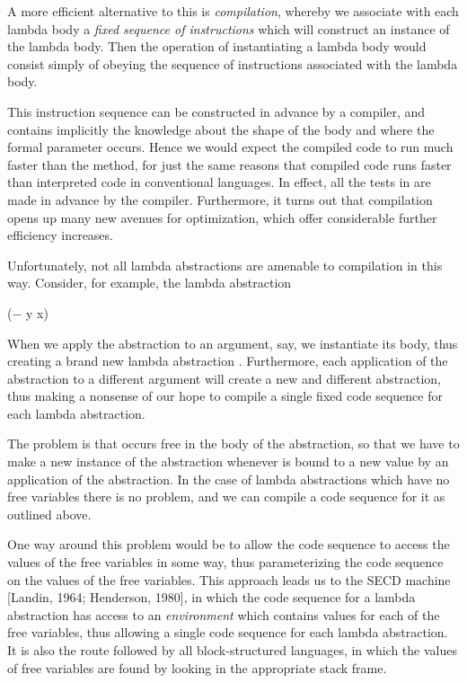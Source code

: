 A more efficient alternative to this is \textit{compilation}, whereby we associate
with each lambda body a \textit{fixed sequence of instructions} which will construct an
instance of the lambda body. Then the operation of instantiating a lambda
body would consist simply of obeying the sequence of instructions associated
with the lambda body.

This instruction sequence can be constructed in advance by a compiler, and
contains implicitly the knowledge about the shape of the body and where the
formal parameter occurs. Hence we would expect the compiled code to run
much faster than the  method, for just the same reasons that
compiled code runs faster than interpreted code in conventional languages. In
effect, all the tests in  are made in advance by the compiler.
Furthermore, it turns out that compilation opens up many new avenues for
optimization, which offer considerable further efficiency increases.

Unfortunately, not all lambda abstractions are amenable to compilation in
this way. Consider, for example, the lambda abstraction

\begin{letalign}
    ($-$ y x)
\end{letalign}

When we apply the  abstraction to an argument,  say, we instantiate its
body, thus creating a brand new lambda abstraction .
Furthermore, each application of the  abstraction to a different argument
will create a new and different  abstraction, thus making a nonsense of our
hope to compile a single fixed code sequence for each lambda abstraction.

The problem is that  occurs free in the body of the  abstraction, so that
we have to make a new instance of the  abstraction whenever  is bound to a
new value by an application of the   abstraction. In the case of lambda
abstractions which have no free variables there is no problem, and we can
compile a code sequence for it as outlined above.

One way around this problem would be to allow the code sequence to
access the values of the free variables in some way, thus parameterizing the
code sequence on the values of the free variables. This approach leads us to
the SECD machine [Landin, 1964; Henderson, 1980], in which the code
sequence for a lambda abstraction has access to an \textit{environment} which
contains values for each of the free variables, thus allowing a single code
sequence for each lambda abstraction. It is also the route followed by all
block-structured languages, in which the values of free variables are found by
looking in the appropriate stack frame.

